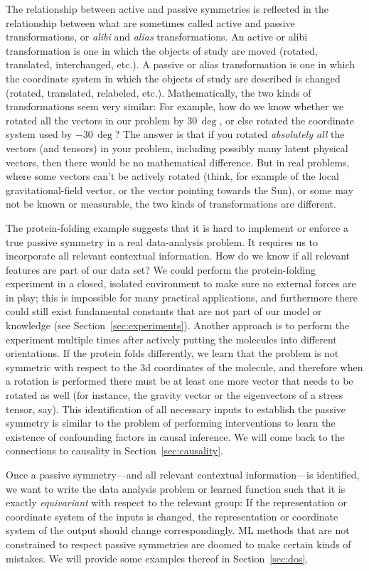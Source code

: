 \documentclass{article}
\theoremstyle{plain}
\theoremstyle{definition}
\theoremstyle{remark}
\newcommand{\sectionname}{Section}
\newcommand{\secref}[1]{\sectionname~\ref{#1}}
\begin{document}
The relationship between active and passive symmetries is reflected in the relationship between what are sometimes called active and passive transformations, or \emph{alibi} and \emph{alias} transformations.
An active or alibi transformation is one in which the objects of study are moved (rotated, translated, interchanged, etc.).
A passive or alias transformation is one in which the coordinate system in which the objects of study are described is changed (rotated, translated, relabeled, etc.).
Mathematically, the two kinds of transformations seem very similar:
For example, how do we know whether we rotated all the vectors in our problem by $30\,\deg$, or else rotated the coordinate system used by $-30\,\deg$?
The answer is that if you rotated \emph{absolutely all} the vectors (and tensors) in your problem, including possibly many latent physical vectors, then there would be no mathematical difference.
But in real problems, where some vectors can't be actively rotated (think, for example of the local gravitational-field vector, or the vector pointing towards the Sun), or some may not be known or measurable, the two kinds of transformations are different.

The protein-folding example suggests that it is hard to implement or enforce a true passive symmetry in a real data-analysis problem.
It requires us to incorporate all relevant contextual information.
How do we know if all relevant features are part of our data set?
We could perform the protein-folding experiment in a closed, isolated environment to make sure no external forces are in play;
this is impossible for many practical applications, and furthermore there could still exist fundamental constants that are not part of our model or knowledge (see \secref{sec:experiments}).
Another approach is to perform the experiment multiple times after actively putting the molecules into different orientations.
If the protein folds differently, we learn that the problem is not symmetric with respect to the 3d coordinates of the molecule, and therefore when a rotation is performed there must be at least one more vector that needs to be rotated as well (for instance, the gravity vector or the eigenvectors of a stress tensor, say).
This identification of all necessary inputs to establish the passive symmetry is similar to the problem of performing interventions to learn the existence of confounding factors in causal inference.
We will come back to the connections to causality in \secref{sec:causality}.

Once a passive symmetry---and all relevant contextual information---is identified, we want to write the data analysis problem or learned function such that it is exactly \emph{equivariant} with respect to the relevant group:
If the representation or coordinate system of the inputs is changed, the representation or coordinate system of the output should change correspondingly.
ML methods that are not constrained to respect passive symmetries are doomed to make certain kinds of mistakes.
We will provide some examples thereof in \secref{sec:dos}.
\end{document}
